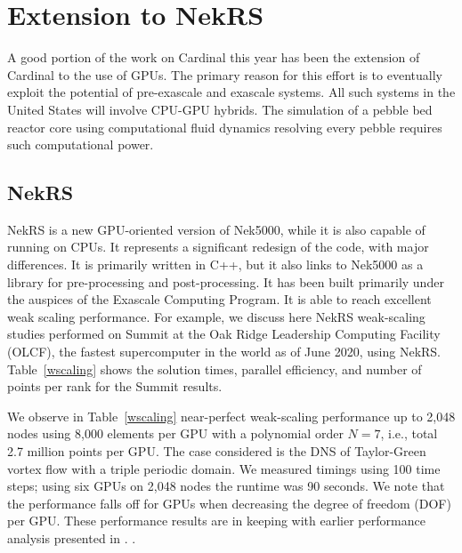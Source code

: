 \section{Extension to NekRS}
\label{s:nrs}

A good portion of the work on Cardinal this year has been the extension of Cardinal to the use of GPUs. The primary reason for this effort is to eventually exploit the potential of pre-exascale and exascale systems.
All such systems in the United States will involve CPU-GPU hybrids. The simulation of a pebble bed reactor core using computational fluid dynamics resolving every pebble requires such computational power.

\subsection{NekRS}

NekRS is a new GPU-oriented version of Nek5000, while it is also capable of running on CPUs. It represents a significant redesign of the code, with major differences. It is primarily written in C++, but it also links to Nek5000 as a library for pre-processing and post-processing. It has been built primarily under the auspices of the Exascale Computing Program. It is able to reach excellent weak scaling performance. For example, we discuss here NekRS weak-scaling studies performed on Summit at the Oak Ridge Leadership Computing Facility (OLCF), the fastest supercomputer in the world as of June 2020, using NekRS. Table~\ref{wscaling} shows the solution times, parallel efficiency, and number of points per rank for the Summit results.

We observe in Table~\ref{wscaling} near-perfect weak-scaling performance up to 2,048 nodes using 8,000 elements per GPU with a polynomial order  $N=7$, i.e., total 2.7 million points per GPU. The case considered is the DNS of Taylor-Green vortex flow with a triple periodic domain. We measured timings using 100 time steps; using six GPUs on 2,048 nodes the runtime was 90 seconds. 
We note that the performance falls off for GPUs when decreasing the degree of freedom (DOF) per GPU.  
These performance results are in keeping with earlier performance analysis presented in \cite{fischer15,min2015a}. .

